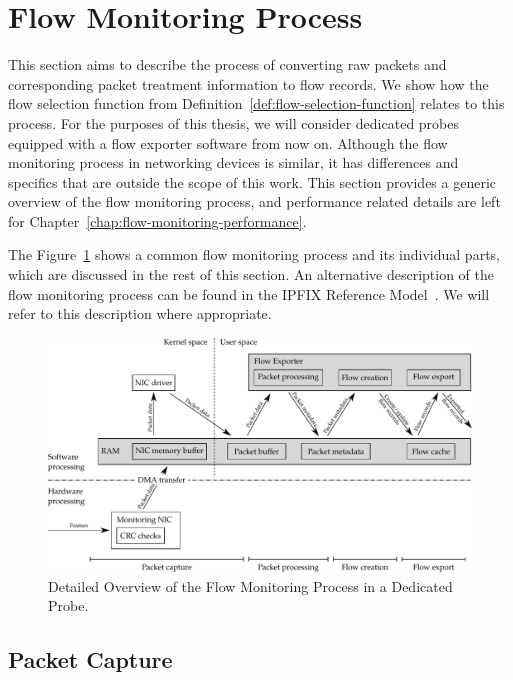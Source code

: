 \section{Flow Monitoring Process}\label{sec:flow-monitoring-process}

This section aims to describe the process of converting raw packets and corresponding packet treatment information to flow records. We show how the flow selection function from Definition~\ref{def:flow-selection-function} relates to this process. For the purposes of this thesis, we will consider dedicated probes equipped with a flow exporter software from now on. Although the flow monitoring process in networking devices is similar, it has differences and specifics that are outside the scope of this work. This section provides a generic overview of the flow monitoring process, and performance related details are left for Chapter~\ref{chap:flow-monitoring-performance}.

The Figure~\ref{fig:flow_monitoring_process_detail} shows a common flow monitoring process and its individual parts, which are discussed in the rest of this section. An alternative description of the flow monitoring process can be found in the IPFIX Reference Model~\cite{rfc5470}. We will refer to this description where appropriate.

\begin{figure}
  \begin{center}
    \includegraphics{figures/c02/flow-monitoring-process-detail}
  \end{center}
  \caption{Detailed Overview of the Flow Monitoring Process in a Dedicated Probe.}
  \label{fig:flow_monitoring_process_detail}
\end{figure}

\subsection{Packet Capture}

